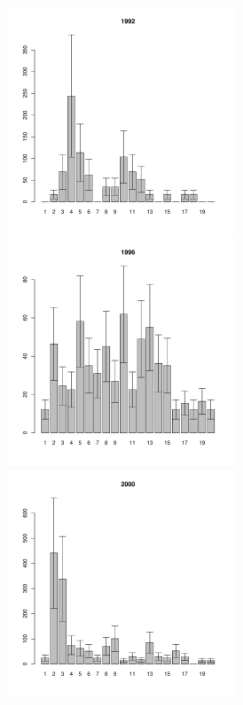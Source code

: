 \begin{figure}[h]

\begin{multicols}{3}
\hfill
\includegraphics[width=60mm]{../White_Sea/Luvenga_II_razrez/low_beatch_1992_.pdf}
\hfill
\includegraphics[width=60mm]{../White_Sea/Luvenga_II_razrez/low_beatch_1996_.pdf}
\hfill
\includegraphics[width=60mm]{../White_Sea/Luvenga_II_razrez/low_beatch_2000_.pdf}
\end{multicols}




\end{figure}
